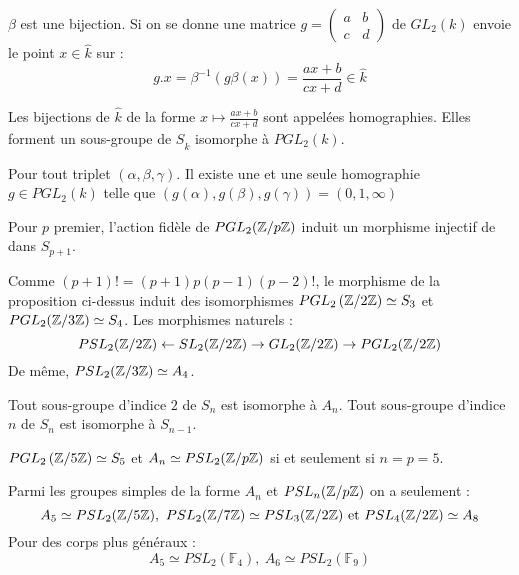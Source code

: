 \documentclass{cours}
\begin{document}
\begin{proposition}
    $\beta$ est une bijection. Si on se donne une matrice $g = \left(\begin{array}{cc} a & b \\ c & d     
    \end{array}\right)$ de $GL_{2}(k)$ envoie le point $x \in \hat{k}$ sur :
    \[
        g.x = \beta^{-1}\left(g\beta(x)\right) = \frac{ax + b}{cx + d} \in \hat{k}
    \]
\end{proposition}

\begin{definition}
    Les bijections de $\hat{k}$ de la forme $x \mapsto \frac{ax +b}{cx +d}$ sont appelées homographies. Elles forment un sous-groupe de $S_{\hat{k}}$ isomorphe à $PGL_{2}(k)$.
\end{definition}
\begin{proposition}
    Pour tout triplet $\left(\alpha, \beta, \gamma\right)$. Il existe une et une seule homographie $g \in PGL_{2}(k)$ telle que $\left(g(\alpha), g(\beta), g(\gamma)\right) = \left(0, 1, \infty\right)$
\end{proposition}
\begin{proposition}
    Pour $p$ premier, l'action fidèle de $PGL_{2}(\mathbb{Z}/p\mathbb{Z})$ induit un morphisme injectif de dans $S_{p + 1}$.
\end{proposition}
\begin{corollary}
    Comme $\left(p + 1\right)! = (p + 1) p (p-1)(p - 2)!$, le morphisme de la proposition ci-dessus induit des isomorphismes $PGL_{2}\left(\mathbb{Z}/2\mathbb{Z}\right) \simeq S_{3}$ et $PGL_{2}(\mathbb{Z}/3\mathbb{Z}) \simeq S_{4}$. Les morphismes naturels : 
    \[
        PSL_{2}(\mathbb{Z}/2\mathbb{Z}) \leftarrow SL_{2}(\mathbb{Z}/2\mathbb{Z}) \rightarrow GL_{2}(\mathbb{Z}/2\mathbb{Z}) \rightarrow PGL_{2}(\mathbb{Z}/2\mathbb{Z})
    \]
    De même, $PSL_{2}(\mathbb{Z}/3\mathbb{Z}) \simeq A_{4}$.
\end{corollary}

\begin{proposition}
    Tout sous-groupe d'indice $2$ de $S_{n}$ est isomorphe à $A_{n}$. Tout sous-groupe d'indice $n$ de $S_n$ est isomorphe à $S_{n - 1}$.
\end{proposition}

\begin{corollary}
    $PGL_{2}\left(\mathbb{Z}/5\mathbb{Z}\right) \simeq S_{5}$ et $A_{n} \simeq PSL_{2}(\mathbb{Z}/p\mathbb{Z})$ si et seulement si $n = p = 5$.
\end{corollary}

\begin{remark}
    Parmi les groupes simples de la forme $A_{n}$ et $PSL_{n}(\mathbb{Z}/p\mathbb{Z})$ on a seulement : 
    \[
        A_{5} \simeq PSL_{2}(\znz{5}), \ PSL_{2}(\znz{7}) \simeq PSL_{3}(\znz{2}) \text{ et } PSL_{4}(\znz{2}) \simeq A_{8}
    \]
    Pour des corps plus généraux : 
    \[
        A_{5} \simeq PSL_{2}(\mathbb{F}_{4}), \ A_{6} \simeq PSL_{2}(\mathbb{F}_{9})    
    \]
\end{remark}
\end{document}

